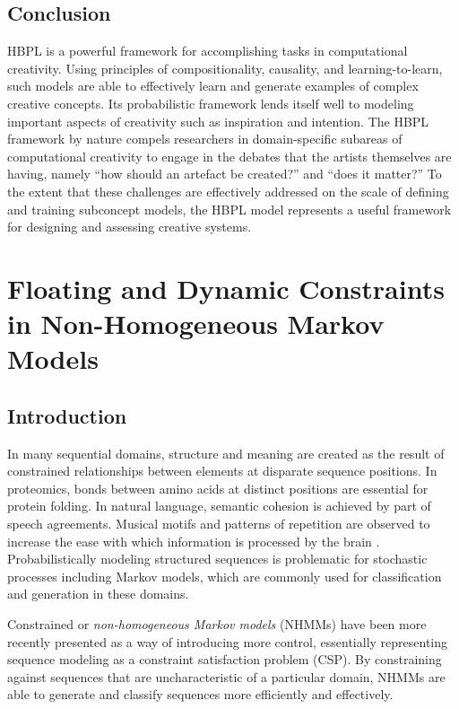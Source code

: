 \documentclass[phd,electronic,oneside,twosidetoc,letterpaper,chaptercenter,parttop,lof,lot]{byumsphd}
\begin{document}
\section{Conclusion}

HBPL is a powerful framework for accomplishing tasks in computational creativity. Using principles of compositionality, causality, and learning-to-learn, such models are able to effectively learn and generate examples of complex creative concepts. Its probabilistic framework lends itself well to modeling important aspects of creativity such as inspiration and intention. The HBPL framework by nature compels researchers in domain-specific subareas of computational creativity to engage in the debates that the artists themselves are having, namely ``how should an artefact be created?'' and ``does it matter?'' To the extent that these challenges are effectively addressed on the scale of defining and training subconcept models, the HBPL model represents a useful framework for designing and assessing creative systems.

\chapter{Floating and Dynamic Constraints in Non-Homogeneous Markov Models}

\section{Introduction}

In many sequential domains, structure and meaning are created as the result of constrained relationships between elements at disparate sequence positions. In proteomics, bonds between amino acids at distinct positions are essential for protein folding. In natural language, semantic cohesion is achieved by part of speech agreements. Musical motifs and patterns of repetition are observed to increase the ease with which information is processed by the brain \cite{Nunes2014}. Probabilistically modeling structured sequences is problematic for stochastic processes including Markov models, which are commonly used for classification and generation in these domains. 

Constrained or \textit{non-homogeneous Markov models} (NHMMs) \cite{pachet2011finite} have been more recently presented as a way of introducing more control, essentially representing sequence modeling as a constraint satisfaction problem (CSP). By constraining against sequences that are uncharacteristic of a particular domain, NHMMs are able to generate and classify sequences more efficiently and effectively. 
\end{document}
